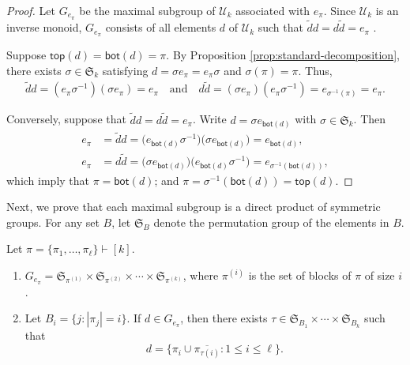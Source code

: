 \documentclass[ALCO,Unicode]{cedram}
\begin{document}
\begin{proof}
    Let $G_{e_\pi}$ be the maximal subgroup of $\mathcal{U}_k$ associated with $e_\pi$.
    Since $\mathcal{U}_k$ is an inverse monoid, $G_{e_\pi}$ consists of all
    elements $d$ of $\mathcal{U}_k$ such that $\widetilde{d}d = d\widetilde{d} = e_\pi$ \cite[Corollary 3.6]{Steinberg.2016}.

    Suppose $\mathsf{top}(d) = \mathsf{bot}(d) = \pi$.
    By Proposition \ref{prop:standard-decomposition},
    there exists $\sigma \in \mathfrak{S}_k$ satisfying $d = \sigma e_\pi = e_\pi \sigma$
    and $\sigma(\pi) = \pi$. Thus,
    \begin{align*}
        \widetilde{d} d = (e_\pi \sigma^{-1}) (\sigma e_\pi) = e_\pi
        \quad\text{and}\quad
        d \widetilde{d} = (\sigma e_\pi) (e_\pi \sigma^{-1}) = e_{\sigma^{-1}(\pi)} = e_{\pi}.
    \end{align*}

    Conversely, suppose that $\widetilde{d}d = d\widetilde{d} = e_\pi$.
    Write $d = \sigma e_{\mathsf{bot}(d)}$ with $\sigma \in \mathfrak{S}_k$.
    Then
    \begin{align*}
        e_\pi & = \widetilde{d}d = \big(e_{\mathsf{bot}(d)} \sigma^{-1}\big) \big(\sigma e_{\mathsf{bot}(d)}\big) = e_{\mathsf{bot}(d)},\\
        e_\pi &= d \widetilde{d} = \big(\sigma e_{\mathsf{bot}(d)}\big) \big(e_{\mathsf{bot}(d)} \sigma^{-1}\big) = e_{\sigma^{-1}(\mathsf{bot}(d))},
    \end{align*}
    which imply that $\pi = \mathsf{bot}(d)$; and $\pi = \sigma^{-1}(\mathsf{bot}(d)) = \mathsf{top}(d)$.
\end{proof}

Next, we prove that each maximal subgroup is a direct product of symmetric groups.
For any set $B$, let $\mathfrak{S}_B$ denote the permutation group of the elements in $B$.

\begin{prop}\label{prop:structGe}
    Let $\pi = \{\pi_1, \ldots, \pi_\ell\}\vdash [k]$.
    \begin{enumerate}
        \item
            $G_{e_\pi} = \mathfrak{S}_{\pi^{(1)}} \times \mathfrak{S}_{\pi^{(2)}}
            \times \cdots \times \mathfrak{S}_{\pi^{(k)}}$,
            where $\pi^{(i)}$ is the set of blocks of $\pi$ of size $i$.

        \item
            Let $B_i=\{j : |\pi_j| = i \}$. If $d \in G_{e_{\pi}}$, then there
            exists $\tau \in \mathfrak{S}_{B_1}\times \cdots \times
            \mathfrak{S}_{B_k}$ such that
            \begin{equation*}
                d = \big\{
                    \pi_i \cup \overline{\pi_{\tau(i)}} : 1 \leqslant i \leqslant \ell
                \big\}.
            \end{equation*}
    \end{enumerate}
\end{prop}
\end{document}
